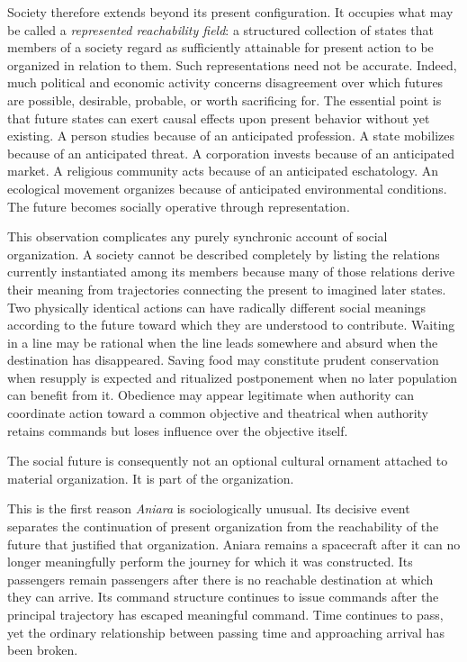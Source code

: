 \documentclass[11pt,oneside]{book}
\theoremstyle{definition}
\theoremstyle{remark}
\begin{document}
Society therefore extends beyond its present configuration. It occupies what may be called a \emph{represented reachability field}: a structured collection of states that members of a society regard as sufficiently attainable for present action to be organized in relation to them. Such representations need not be accurate. Indeed, much political and economic activity concerns disagreement over which futures are possible, desirable, probable, or worth sacrificing for. The essential point is that future states can exert causal effects upon present behavior without yet existing. A person studies because of an anticipated profession. A state mobilizes because of an anticipated threat. A corporation invests because of an anticipated market. A religious community acts because of an anticipated eschatology. An ecological movement organizes because of anticipated environmental conditions. The future becomes socially operative through representation.

This observation complicates any purely synchronic account of social organization. A society cannot be described completely by listing the relations currently instantiated among its members because many of those relations derive their meaning from trajectories connecting the present to imagined later states. Two physically identical actions can have radically different social meanings according to the future toward which they are understood to contribute. Waiting in a line may be rational when the line leads somewhere and absurd when the destination has disappeared. Saving food may constitute prudent conservation when resupply is expected and ritualized postponement when no later population can benefit from it. Obedience may appear legitimate when authority can coordinate action toward a common objective and theatrical when authority retains commands but loses influence over the objective itself.

The social future is consequently not an optional cultural ornament attached to material organization. It is part of the organization.

This is the first reason \emph{Aniara} is sociologically unusual. Its decisive event separates the continuation of present organization from the reachability of the future that justified that organization. Aniara remains a spacecraft after it can no longer meaningfully perform the journey for which it was constructed. Its passengers remain passengers after there is no reachable destination at which they can arrive. Its command structure continues to issue commands after the principal trajectory has escaped meaningful command. Time continues to pass, yet the ordinary relationship between passing time and approaching arrival has been broken.
\end{document}
